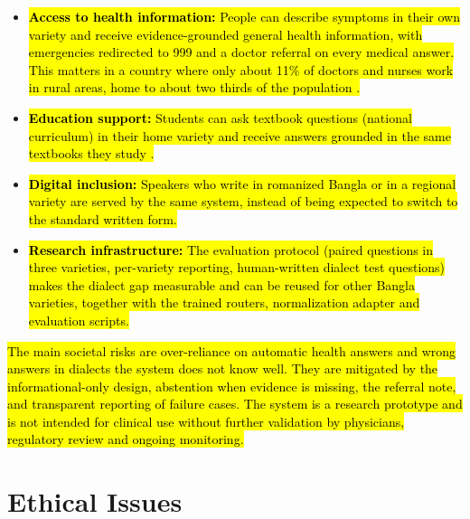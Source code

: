\begin{itemize}
\item \hl{\textbf{Access to health information:} People can describe
symptoms in their own variety and receive evidence-grounded general
health information, with emergencies redirected to 999 and a doctor
referral on every medical answer. This matters in a country where only
about 11\% of doctors and nurses work in rural areas, home to about two
thirds of the population \cite{nuruzzaman2022informing}.}

\item \hl{\textbf{Education support:} Students can ask textbook questions
(national curriculum) in their home variety and receive answers grounded
in the same textbooks they study \cite{nctbqa}.}

\item \hl{\textbf{Digital inclusion:} Speakers who write in romanized Bangla
or in a regional variety are served by the same system, instead of being
expected to switch to the standard written form.}

\item \hl{\textbf{Research infrastructure:} The evaluation protocol (paired
questions in three varieties, per-variety reporting, human-written
dialect test questions) makes the dialect gap measurable and can be
reused for other Bangla varieties, together with the trained routers,
normalization adapter and evaluation scripts.}
\end{itemize}

\hl{The main societal risks are over-reliance on automatic health
answers and wrong answers in dialects the system does not know well.
They are mitigated by the informational-only design, abstention when
evidence is missing, the referral note, and transparent reporting of
failure cases. The system is a research prototype and is not intended
for clinical use without further validation by physicians, regulatory
review and ongoing monitoring.}

\section{Ethical Issues}\label{ethical-issues}

